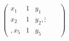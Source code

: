\documentclass[preview]{standalone}
\begin{document}
\begin{align*}
\left(\begin{array}{cc|c} x_1 & 1 & y_1 \\ x_2 & 1 & y_2, \vdots & & \\, x_5 & 1 & y_5 \end{array}\right)
\end{align*}
\end{document}

